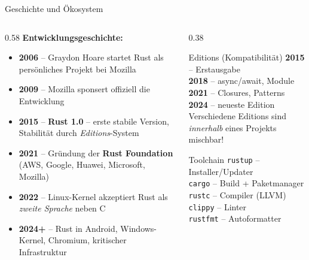 \documentclass[%
  aspectratio=169,
  10pt
]{beamer}
\begin{document}
\begin{frame}{Geschichte und Ökosystem}
  \begin{columns}[T]
    \begin{column}{0.58\textwidth}
      \small
      \textbf{Entwicklungsgeschichte:}
      \begin{itemize}
        \item \textbf{2006} -- Graydon Hoare startet Rust als
              persönliches Projekt bei Mozilla
        \item \textbf{2009} -- Mozilla sponsert offiziell die Entwicklung
        \item \textbf{2015} -- \textbf{Rust 1.0} -- erste stabile Version,
              Stabilität durch \emph{Editions}-System
        \item \textbf{2021} -- Gründung der \textbf{Rust Foundation}
              (AWS, Google, Huawei, Microsoft, Mozilla)
        \item \textbf{2022} -- Linux-Kernel akzeptiert Rust als
              \emph{zweite Sprache} neben C
        \item \textbf{2024+} -- Rust in Android, Windows-Kernel,
              Chromium, kritischer Infrastruktur
      \end{itemize}
    \end{column}
    \begin{column}{0.38\textwidth}
      \small
      \begin{block}{Editions (Kompatibilität)}
        \textbf{2015} -- Erstausgabe\\
        \textbf{2018} -- async/await, Module\\
        \textbf{2021} -- Closures, Patterns\\
        \textbf{2024} -- neueste Edition\\[0.2em]
        Verschiedene Editions sind \emph{innerhalb}
        eines Projekts mischbar!
      \end{block}
      \begin{exampleblock}{Toolchain}
        \texttt{rustup} -- Installer/Updater\\
        \texttt{cargo} -- Build + Paketmanager\\
        \texttt{rustc} -- Compiler (LLVM)\\
        \texttt{clippy} -- Linter\\
        \texttt{rustfmt} -- Autoformatter
      \end{exampleblock}
    \end{column}
  \end{columns}

\end{frame}
\end{document}
